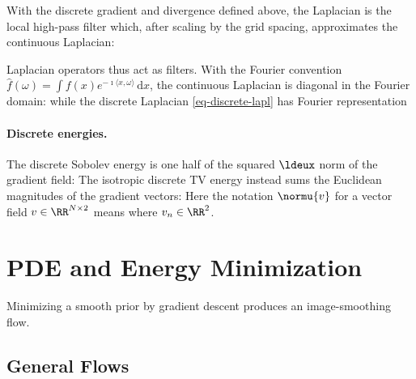 With the discrete gradient and divergence defined above, the Laplacian is the local high-pass filter
which, after scaling by the grid spacing, approximates the continuous Laplacian:

Laplacian operators thus act as filters. With the Fourier convention $\hat f(\omega)=\int f(x)e^{-\imath\langle x,\omega\rangle}\,\mathrm{d}x$, the continuous Laplacian is diagonal in the Fourier domain:
while the discrete Laplacian \eqref{eq-discrete-lapl} has Fourier representation

\paragraph{Discrete energies.}

The discrete Sobolev energy is one half of the squared $\ldeux$ norm of the gradient field:
The isotropic discrete TV energy instead sums the Euclidean magnitudes of the gradient vectors:
Here the notation $\normu{v}$ for a vector field $v \in \RR^{N \times 2}$ means
where $v_n \in \RR^2$.

\section{PDE and Energy Minimization}

Minimizing a smooth prior by gradient descent produces an image-smoothing flow.

\subsection{General Flows}

